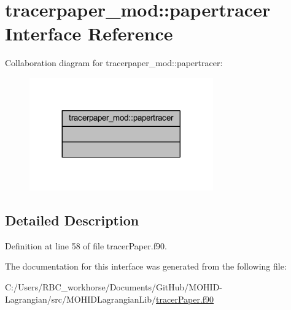 \hypertarget{interfacetracerpaper__mod_1_1papertracer}{}\section{tracerpaper\+\_\+mod\+:\+:papertracer Interface Reference}
\label{interfacetracerpaper__mod_1_1papertracer}


Collaboration diagram for tracerpaper\+\_\+mod\+:\+:papertracer\+:\nopagebreak
\begin{figure}[H]
\begin{center}
\leavevmode
\includegraphics[width=224pt]{interfacetracerpaper__mod_1_1papertracer__coll__graph}
\end{center}
\end{figure}


\subsection{Detailed Description}


Definition at line 58 of file tracer\+Paper.\+f90.



The documentation for this interface was generated from the following file\+:\begin{DoxyCompactItemize}
\item 
C\+:/\+Users/\+R\+B\+C\+\_\+workhorse/\+Documents/\+Git\+Hub/\+M\+O\+H\+I\+D-\/\+Lagrangian/src/\+M\+O\+H\+I\+D\+Lagrangian\+Lib/\mbox{\hyperlink{tracer_paper_8f90}{tracer\+Paper.\+f90}}\end{DoxyCompactItemize}
